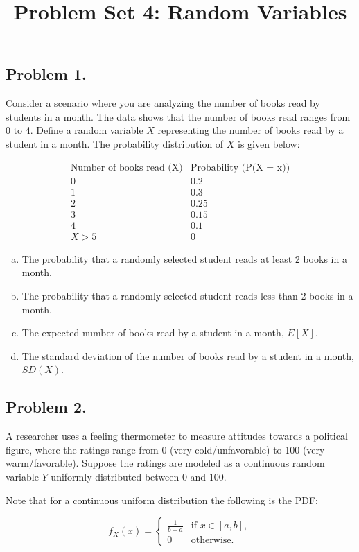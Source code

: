 \documentclass{article}
\title{Problem Set 4: Random Variables}
\author{}
\date{}
\begin{document}
\maketitle

\subsection*{Problem 1.}
Consider a scenario where you are analyzing the number of books read by students in a month. The data shows that the number of books read ranges from 0 to 4. Define a random variable \(X\) representing the number of books read by a student in a month. The probability distribution of \(X\) is given below:

\[
\begin{array}{c|c}
\text{Number of books read (X)} & \text{Probability (P(X = x))} \\
\hline
0 & 0.2 \\
1 & 0.3 \\
2 & 0.25 \\
3 & 0.15 \\
4 & 0.1 \\
X >5 & 0
\end{array}
\]

\begin{enumerate}[a)]
\item The probability that a randomly selected student reads at least 2 books in a month.
\item The probability that a randomly selected student reads less than 2 books in a month.
\item The expected number of books read by a student in a month, \(E[X]\).
\item The standard deviation of the number of books read by a student in a month, \(SD(X)\).
\end{enumerate}

\subsection*{Problem 2.}
A researcher uses a feeling thermometer to measure attitudes towards a political figure, where the ratings range from 0 (very cold/unfavorable) to 100 (very warm/favorable). Suppose the ratings are modeled as a continuous random variable \(Y\) uniformly distributed between 0 and 100.

Note that for a continuous uniform distribution the following is the PDF:

\[
f_X(x) = 
\begin{cases} 
\frac{1}{b-a} & \text{if } x \in [a, b], \\
0 & \text{otherwise}.
\end{cases}
\]
\end{document}
